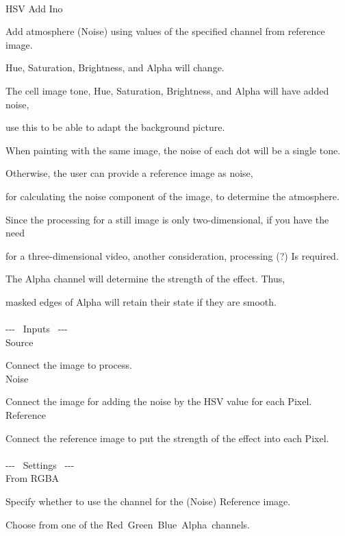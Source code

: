 \documentclass[a4paper,12pt]{article}
\begin{document}
\thispagestyle{empty}

\Large
\noindent \\
HSV Add Ino\medskip
\par
\normalsize
Add atmosphere (Noise) using values of the specified channel from reference image.\par
Hue, Saturation, Brightness, and Alpha will change.\\
\par
The cell image tone, Hue, Saturation, Brightness, and Alpha will have added noise,\par
use this to be able to adapt the background picture.\par
When painting with the same image, the noise of each dot will be a single tone.\par
Otherwise, the user can provide a reference image as noise,\par
for calculating the noise component of the image, to determine the atmosphere.
\\
\par
Since the processing for a still image is only two-dimensional, if you have the need\par
for a three-dimensional video, another consideration, processing (?) Is required.\\
\par
The Alpha channel will determine the strength of the effect. Thus,\par
masked edges of Alpha will retain their state if they are smooth.\\
\\
-{-}- \ Inputs \ -{-}-\\
Source\par
Connect the image to process.\\
Noise\par
Connect the image for adding the noise by the HSV value for each Pixel.\\
Reference\par
Connect the reference image to put the strength of the effect into each Pixel.\\
\\
-{-}- \ Settings \ -{-}-\\
From RGBA\par
Specify whether to use the channel for the (Noise) Reference image.\par
Choose from one of the \textquotedbl Red\textquotedbl \ \textquotedbl Green\textquotedbl \ \textquotedbl Blue\textquotedbl \ \textquotedbl Alpha\textquotedbl \ channels.\par
\end{document}
